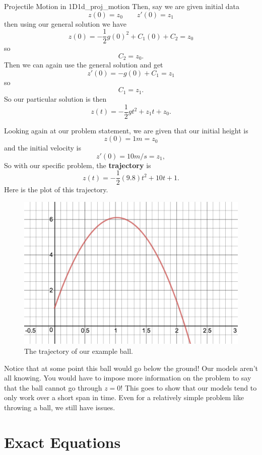 \begin{ex}{Projectile Motion in 1D}{1d_proj_motion}
        Then, say we are given initial data
        \[
        z(0)=z_0 \qquad z'(0)=z_1
        \]
        then using our general solution we have
        \[
        z(0)=-\frac{1}{2}g(0)^2+C_1(0)+C_2=z_0
        \]
        so 
        \[
        C_2=z_0.
        \]
        Then we can again use the general solution and get
        \[
        z'(0)=-g(0)+C_1 = z_1
        \]
        so
        \[
        C_1 = z_1.
        \]
        So our particular solution is then
        \[
        z(t) = -\frac{1}{2}gt^2 + z_1 t + z_0.
        \]
        
        Looking again at our problem statement, we are given that our initial height is
        \[
        z(0)=1m=z_0
        \]
        and the initial velocity is
        \[
        z'(0)=10m/s = z_1,
        \]
        So with our specific problem, the \textbf{trajectory} is
        \[
        z(t)=-\frac{1}{2}(9.8)t^2 + 10t+1.
        \]
        Here is the plot of this trajectory.
        \begin{figure}[H]
            \centering
            \includegraphics[width=.7\textwidth]{Figures/projectile_example.png}
            \caption{The trajectory of our example ball.}
            \label{fig:my_label}
        \end{figure}
        Notice that at some point this ball would go below the ground!  Our models aren't all knowing.  You would have to impose more information on the problem to say that the ball cannot go through $z=0$!  This goes to show that our models tend to only work over a short span in time. Even for a relatively simple problem like throwing a ball, we still have issues.
        \end{ex}
        
        \section{Exact Equations}
        
